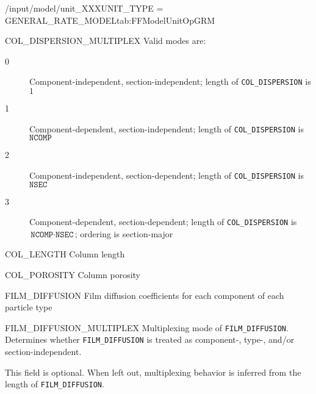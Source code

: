 \begin{condsubgroup}{/input/model/unit\_XXX}{UNIT\_TYPE = GENERAL\_RATE\_MODEL}{tab:FFModelUnitOpGRM}
\begin{dataset}[unit=--,type=int,range={$\{0, \dots, 3 \}$},length={1}]{COL\_DISPERSION\_MULTIPLEX}
    Valid modes are:
    \begin{description}
      \item[0] Component-independent, section-independent; length of \texttt{COL\_DISPERSION} is $1$
      \item[1] Component-dependent, section-independent; length of \texttt{COL\_DISPERSION} is $\texttt{NCOMP}$
      \item[2] Component-independent, section-dependent; length of \texttt{COL\_DISPERSION} is $\texttt{NSEC}$
      \item[3] Component-dependent, section-dependent; length of \texttt{COL\_DISPERSION} is $\texttt{NCOMP} \cdot \texttt{NSEC}$; ordering is section-major
    \end{description}\vspace{-\baselineskip}
  \end{dataset}
  \begin{dataset}[unit=\si{\metre},type=double,range={$> 0$},length={1}]{COL\_LENGTH}
    Column length
  \end{dataset}
  \begin{dataset}[unit=--,type=double,range={$(0,1]$},length={1}]{COL\_POROSITY}
    Column porosity
  \end{dataset}
  \begin{dataset}[unit=\si{\metre\per\second},type=double,range={$\geq 0$},length={see \texttt{FILM\_DIFFUSION\_MULTIPLEX}}]{FILM\_DIFFUSION}
    Film diffusion coefficients for each component of each particle type
  \end{dataset}
  \begin{dataset}[unit=--,type=int,range={$\{0, \dots, 3 \}$},length={1}]{FILM\_DIFFUSION\_MULTIPLEX}
    Multiplexing mode of \texttt{FILM\_DIFFUSION}.
    Determines whether \texttt{FILM\_DIFFUSION} is treated as component-, type-, and/or section-independent.

    This field is optional.
    When left out, multiplexing behavior is inferred from the length of \texttt{FILM\_DIFFUSION}.


\end{dataset}
\end{condsubgroup}
